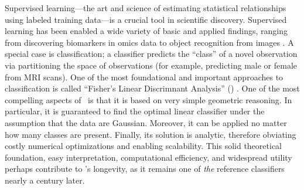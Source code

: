\documentclass[10pt]{article}
\begin{document}
\vspace{15pt}

\clearpage
\linenumbers



%
%




Supervised learning---the art and science of estimating statistical relationships using labeled training data---is a crucial tool in scientific discovery.  Supervised learning has been enabled a wide variety of basic and applied findings, ranging from discovering biomarkers in omics data \cite{Vogelstein2014a} to object recognition from images \cite{Krizhevsky2012}.
A special case is classification; a classifier predicts the ``class'' of a novel observation via partitioning the space of observations (for example, predicting male  or female from MRI scans). One of the most foundational and important approaches to classification is called ``Fisher's Linear Discrimnant Analysis'' (\Lda) \cite{Fisher1925a}. One of the most compelling aspects of \Lda~is that it is based on very simple geometric reasoning.  In particular, it is guaranteed to find the optimal linear classifier under the assumption that the data are Gaussian. Moreover, it can be applied no matter how many classes are present. Finally, its solution is analytic, therefore obviating costly numerical optimizations and enabling scalability. This solid theoretical foundation, easy interpretation, computational efficiency, and widespread utility perhaps contribute to \Lda's longevity, as it remains one of \emph{the} reference classifiers nearly a century later.
\end{document}
